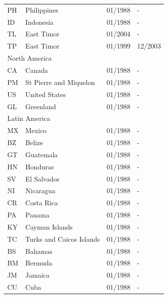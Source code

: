 \begin{small}
\begin{longtable}{p{0.5cm}p{9cm}p{2cm}p{2cm}}
PH	&	Philippines	&	01/1988	&	-	\\

ID	&	Indonesia	&	01/1988	&	-	\\

TL	&	East Timor	&	01/2004	&	-	\\

TP	&	East Timor	&	01/1999	&	12/2003	\\

\midrule
\multicolumn{3}{l}{North America}	&	\\
CA	&	Canada	&	01/1988	&	-	\\

PM	&	St Pierre and Miquelon	&	01/1988	&	-	\\

US	&	United States	&	01/1988	&	-	\\

GL	&	Greenland	&	01/1988	&	-	\\

\midrule
\multicolumn{3}{l}{Latin America}	&	\\
MX	&	Mexico	&	01/1988	&	-	\\

BZ	&	Belize	&	01/1988	&	-	\\

GT	&	Guatemala	&	01/1988	&	-	\\

HN	&	Honduras	&	01/1988	&	-	\\

SV	&	El Salvador	&	01/1988	&	-	\\

NI	&	Nicaragua	&	01/1988	&	-	\\

CR	&	Costa Rica	&	01/1988	&	-	\\

PA	&	Panama	&	01/1988	&	-	\\

KY	&	Cayman Islands	&	01/1988	&	-	\\

TC	&	Turks and Caicos Islands	&	01/1988	&	-	\\

BS	&	Bahamas	&	01/1988	&	-	\\

BM	&	Bermuda	&	01/1988	&	-	\\

JM	&	Jamaica	&	01/1988	&	-	\\

CU	&	Cuba	&	01/1988	&	-	\\


\end{longtable}
\end{small}
